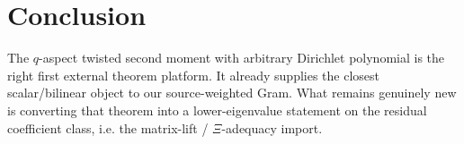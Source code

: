 \documentclass[11pt]{article}
\begin{document}
\section{Conclusion}
The $q$-aspect twisted second moment with arbitrary Dirichlet polynomial is the right first external theorem platform. It already supplies the closest scalar/bilinear object to our source-weighted Gram. What remains genuinely new is converting that theorem into a lower-eigenvalue statement on the residual coefficient class, i.e. the matrix-lift / $\Xi$-adequacy import.
\end{document}
